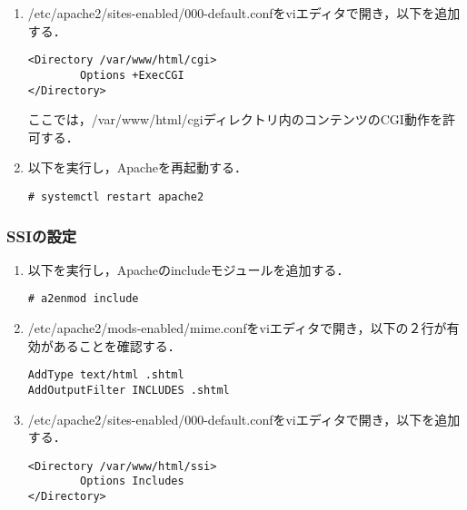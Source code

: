 \documentclass[a4j,titlepage]{jarticle}
\begin{document}
\begin{itemize}
\begin{enumerate}
\item /etc/apache2/sites-enabled/000-default.confをviエディタで開き，以下を追加する．
\begin{screen}
\begin{center}
\begin{verbatim}
<Directory /var/www/html/cgi>
        Options +ExecCGI
</Directory>
\end{verbatim}
\end{center}
\end{screen}
ここでは，/var/www/html/cgiディレクトリ内のコンテンツのCGI動作を許可する．

\item 以下を実行し，Apacheを再起動する．
\begin{screen}
\begin{center}
\begin{verbatim}
# systemctl restart apache2
\end{verbatim}
\end{center}
\end{screen}

\end{enumerate}

\subsubsection{SSIの設定}

\begin{enumerate}
\item 以下を実行し，Apacheのincludeモジュールを追加する．
\begin{screen}
\begin{center}
\begin{verbatim}
# a2enmod include
\end{verbatim}
\end{center}
\end{screen}

\item /etc/apache2/mods-enabled/mime.confをviエディタで開き，以下の２行が有効があることを確認する．
\begin{screen}
\begin{center}
\begin{verbatim}
AddType text/html .shtml
AddOutputFilter INCLUDES .shtml
\end{verbatim}
\end{center}
\end{screen}

\item /etc/apache2/sites-enabled/000-default.confをviエディタで開き，以下を追加する．
\begin{screen}
\begin{center}
\begin{verbatim}
<Directory /var/www/html/ssi>
        Options Includes
</Directory>
\end{verbatim}
\end{center}
\end{screen}


\end{enumerate}
\end{itemize}
\end{document}
